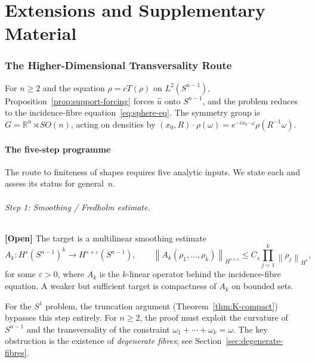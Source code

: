 \documentclass[12pt]{article}
\theoremstyle{definition}
\theoremstyle{remark}
\newcommand{\R}{\mathbb{R}}
\newcommand{\wh}{\widehat}
\newcommand{\norm}[1]{\left\|#1\right\|}
\newcommand{\open}{\textbf{\color{red}[Open]}}
\begin{document}

\part{Extensions and Supplementary Material}

\section{The Higher-Dimensional Transversality Route}
\label{sec:higher-dim}

For $n\geq 2$ and the equation $\rho=cT(\rho)$ on $L^2(S^{n-1})$,
Proposition~\ref{prop:support-forcing} forces $\wh u$ onto $S^{n-1}$,
and the problem reduces to the incidence-fibre equation~\eqref{eq:sphere-eq}.
The symmetry group is $G=\R^n\rtimes SO(n)$, acting on densities by
$(x_0,R)\cdot\rho(\omega)=e^{-ix_0\cdot\omega}\rho(R^{-1}\omega)$.

\subsection{The five-step programme}

The route to finiteness of shapes requires five analytic inputs.  We state
each and assess its status for general~$n$.

\paragraph{Step 1: Smoothing / Fredholm estimate.}  \open\quad
The target is a multilinear smoothing estimate
\[
  A_k:H^s(S^{n-1})^k\to H^{s+\varepsilon}(S^{n-1}),
  \qquad
  \norm{A_k(\rho_1,\ldots,\rho_k)}_{H^{s+\varepsilon}}
  \leq C_s\prod_{j=1}^k\norm{\rho_j}_{H^s},
\]
for some $\varepsilon>0$, where $A_k$ is the $k$-linear operator behind
the incidence-fibre equation.  A weaker but sufficient target is
compactness of $A_k$ on bounded sets.

For the $S^1$ problem, the truncation argument
(Theorem~\ref{thm:K-compact}) bypasses this step entirely.  For $n\geq 2$,
the proof must exploit the curvature of $S^{n-1}$ and the transversality
of the constraint $\omega_1+\cdots+\omega_k=\omega$.  The key obstruction
is the existence of \emph{degenerate fibres}; see
Section~\ref{sec:degenerate-fibres}.
\end{document}
